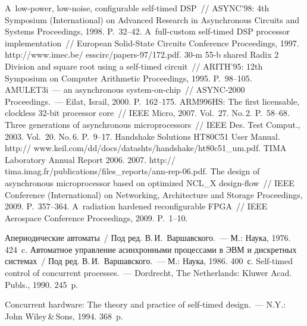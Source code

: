 \begin{multicols}{2}
{{\begin{thebibliography}{99}
 A~low-power, 
low-noise, configurable self-timed DSP~// ASYNC'98:  4th Symposium (International) on 
Advanced Research in Asynchronous Circuits and Systems Proceedings, 1998. P.~32--42.
 A~full-custom self-timed DSP processor implementation~//  European 
Solid-State Circuits Conference Proceedings, 1997. 
{\sf http://www.imec.be/ esscirc/papers-97/172.pdf}.
 \mbox{30-m} 55-b shared Radix 2 Division and 
square root using a self-timed circuit~// ARITH'95:  12th Symposium on Computer Arithmetic 
Proceedings, 1995. P.~98--105.
 AMULET3i~--- an asynchronous system-on-chip~//  
ASYNC-2000 Proceedings.~--- Eilat, Israil, 2000. P.~162--175.
 ARM996HS: The first licensable, clockless 32-bit processor core~// IEEE 
Micro, 2007. Vol.~27. No.\,2. P.~58--68.
 Three generations of asynchronous 
microprocessors~// IEEE Des. Test Comput., 2003. Vol.~20. No.\,6. P.~9--17.
Handshake Solutions HT80C51 User Manual. {\sf 
http:// www.keil.com/dd/docs/datashts/handshake/ht80c51\_\linebreak um.pdf}.
TIMA Laboratory Annual Report 2006. 2007. {\sf 
http:// tima.imag.fr/publications/files\_reports/ann-rep-06.pdf}.
 The design of asynchronous microprocessor based on 
optimized NCL\_X design-flow~// IEEE Conference (International) on Networking, 
Architecture and Storage Proceedings, 2009. P.~357--364.
 A~radiation hardened reconfigurable FPGA~//  IEEE Aerospace 
Conference Proceedings, 2009. P.~1--10.


Апериодические автоматы~/ Под ред. В.\,И.~Варшавского.~--- М.: Наука, 1976. 424~c.
Автоматное  управление асинхронными процессами в ЭВМ и дискретных сис\-те\-мах~/  Под 
ред. В.\,И.~Варшавского.~---  М.: Наука, 1986. 400~с.
 Self-timed control of 
concurrent processes.~--- Dordrecht, The Netherlands: Kluwer Acad. Publs., 1990. 
245~p.

  Concurrent hardware: The 
theory and practice of self-timed design.~--- N.Y.: John Wiley\,\&\,Sons, 1994. 368~p.


\end{thebibliography}}}
\end{multicols}
